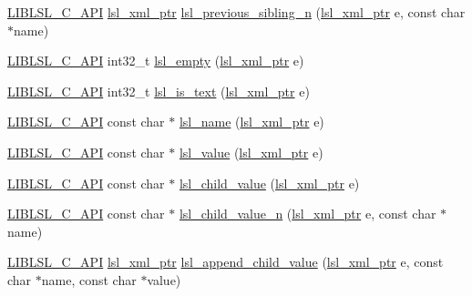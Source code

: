 \begin{DoxyCompactItemize}
\item 
\hyperlink{lsl__cpp_8h_aafd0ef1813e8be84a1420c4f1df64615}{L\+I\+B\+L\+S\+L\+\_\+\+C\+\_\+\+A\+PI} \hyperlink{namespacelsl_a5edc7a49a1a1be1634fe6dce3d59c59b}{lsl\+\_\+xml\+\_\+ptr} \hyperlink{namespacelsl_a1b42f95654ea48c92a15bd077e6c73ac}{lsl\+\_\+previous\+\_\+sibling\+\_\+n} (\hyperlink{namespacelsl_a5edc7a49a1a1be1634fe6dce3d59c59b}{lsl\+\_\+xml\+\_\+ptr} e, const char $\ast$name)
\item 
\hyperlink{lsl__cpp_8h_aafd0ef1813e8be84a1420c4f1df64615}{L\+I\+B\+L\+S\+L\+\_\+\+C\+\_\+\+A\+PI} int32\+\_\+t \hyperlink{namespacelsl_aa8e3affdd320f70d77b87262d508ba58}{lsl\+\_\+empty} (\hyperlink{namespacelsl_a5edc7a49a1a1be1634fe6dce3d59c59b}{lsl\+\_\+xml\+\_\+ptr} e)
\item 
\hyperlink{lsl__cpp_8h_aafd0ef1813e8be84a1420c4f1df64615}{L\+I\+B\+L\+S\+L\+\_\+\+C\+\_\+\+A\+PI} int32\+\_\+t \hyperlink{namespacelsl_a423fa21a73fa370762fe168081f12a41}{lsl\+\_\+is\+\_\+text} (\hyperlink{namespacelsl_a5edc7a49a1a1be1634fe6dce3d59c59b}{lsl\+\_\+xml\+\_\+ptr} e)
\item 
\hyperlink{lsl__cpp_8h_aafd0ef1813e8be84a1420c4f1df64615}{L\+I\+B\+L\+S\+L\+\_\+\+C\+\_\+\+A\+PI} const char $\ast$ \hyperlink{namespacelsl_a55761eae47f0963850f6077b4c61701e}{lsl\+\_\+name} (\hyperlink{namespacelsl_a5edc7a49a1a1be1634fe6dce3d59c59b}{lsl\+\_\+xml\+\_\+ptr} e)
\item 
\hyperlink{lsl__cpp_8h_aafd0ef1813e8be84a1420c4f1df64615}{L\+I\+B\+L\+S\+L\+\_\+\+C\+\_\+\+A\+PI} const char $\ast$ \hyperlink{namespacelsl_a06b7b1f52525d931c57be7eb1216f50a}{lsl\+\_\+value} (\hyperlink{namespacelsl_a5edc7a49a1a1be1634fe6dce3d59c59b}{lsl\+\_\+xml\+\_\+ptr} e)
\item 
\hyperlink{lsl__cpp_8h_aafd0ef1813e8be84a1420c4f1df64615}{L\+I\+B\+L\+S\+L\+\_\+\+C\+\_\+\+A\+PI} const char $\ast$ \hyperlink{namespacelsl_aa6a774c3c6e431610a98be1b83bc8a3b}{lsl\+\_\+child\+\_\+value} (\hyperlink{namespacelsl_a5edc7a49a1a1be1634fe6dce3d59c59b}{lsl\+\_\+xml\+\_\+ptr} e)
\item 
\hyperlink{lsl__cpp_8h_aafd0ef1813e8be84a1420c4f1df64615}{L\+I\+B\+L\+S\+L\+\_\+\+C\+\_\+\+A\+PI} const char $\ast$ \hyperlink{namespacelsl_ac70e2fc6f64715cead7b4b8e776cc6e7}{lsl\+\_\+child\+\_\+value\+\_\+n} (\hyperlink{namespacelsl_a5edc7a49a1a1be1634fe6dce3d59c59b}{lsl\+\_\+xml\+\_\+ptr} e, const char $\ast$name)
\item 
\hyperlink{lsl__cpp_8h_aafd0ef1813e8be84a1420c4f1df64615}{L\+I\+B\+L\+S\+L\+\_\+\+C\+\_\+\+A\+PI} \hyperlink{namespacelsl_a5edc7a49a1a1be1634fe6dce3d59c59b}{lsl\+\_\+xml\+\_\+ptr} \hyperlink{namespacelsl_a3d9fb84fd68c84dd8692e25f1461a894}{lsl\+\_\+append\+\_\+child\+\_\+value} (\hyperlink{namespacelsl_a5edc7a49a1a1be1634fe6dce3d59c59b}{lsl\+\_\+xml\+\_\+ptr} e, const char $\ast$name, const char $\ast$value)

\end{DoxyCompactItemize}
